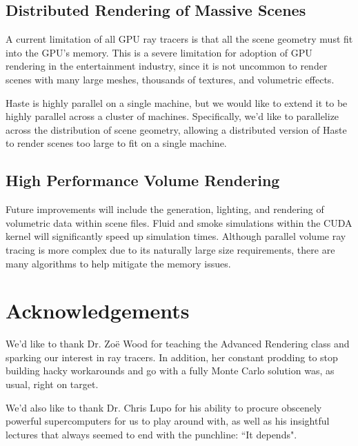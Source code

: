 \documentclass{acmsiggraph}                     %
\begin{document}
    \subsection{Distributed Rendering of Massive Scenes}
    \label{sec:distributed}

    A current limitation of all GPU ray tracers is that all the scene geometry must fit into the
    GPU's memory. This is a severe limitation for adoption of GPU rendering in the entertainment
    industry, since it is not uncommon to render scenes with many large meshes, thousands of
    textures, and volumetric effects.

    Haste is highly parallel on a single machine, but we would like to extend it to be highly
    parallel across a cluster of machines. Specifically, we'd like to parallelize across the
    distribution of scene geometry, allowing a distributed version of Haste to render scenes too
    large to fit on a single machine.

    \subsection{High Performance Volume Rendering}
    \label{sec:volumes}

    Future improvements will include the generation, lighting, and rendering of volumetric data
    within scene files. Fluid and smoke simulations within the CUDA kernel will significantly
    speed up simulation times. Although parallel volume ray tracing is more complex due to its
    naturally large size requirements, there are many algorithms to help mitigate the memory 
    issues.

\section*{Acknowledgements}

We'd like to thank Dr. Zo\"{e} Wood for teaching the Advanced Rendering class and sparking
our interest in ray tracers. In addition, her constant prodding to stop building hacky
workarounds and go with a fully Monte Carlo solution was, as usual, right on target.

We'd also like to thank Dr. Chris Lupo for his ability to procure obscenely powerful
supercomputers for us to play around with, as well as his insightful lectures that always
seemed to end with the punchline: ``It depends".
\end{document}
